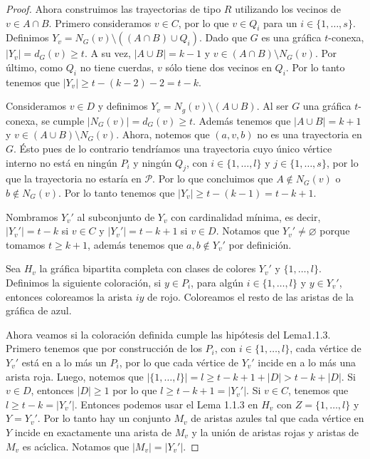 \begin{proof}
    Ahora construimos las trayectorias de tipo $R$ utilizando los vecinos de $v
    \in A \cap B$. Primero consideramos $v \in C$, por lo que $v \in Q_i$ para
    un  $i \in \{1, \dots, s\}$. Definimos $Y_v = N_G(v) \setminus ((A \cap B)
    \cup Q_i)$. Dado que $G$ es una gr\'afica $t$-conexa, $|Y_v| = d_G(v) \geq
    t$. A su vez, $|A \cup B| =k -1$ y $v \in (A \cap B) \setminus N_G(v)$. Por
    \'ultimo, como $Q_i$ no tiene cuerdas, $v$ s\'olo tiene dos vecinos en
    $Q_i$. Por lo tanto tenemos que $|Y_v| \geq t- (k-2)-2 = t-k$. 
    
    Consideramos $v \in D$ y definimos $Y_v = N_g(v) \setminus (A \cup
    B)$. Al ser $G$ una gr\'afica $t$-conexa, se cumple $|N_G(v)| = d_G(v) \geq
    t$. Adem\'as tenemos que $|A \cup B| = k + 1$ y $v \in (A \cup B) \setminus
    N_G(v)$. Ahora, notemos que $(a, v, b)$ no es una trayectoria en $G$. \'Esto
    pues de lo contrario tendr\'i{}amos una trayectoria cuyo \'unico v\'ertice
    interno no est\'a en ning\'un $P_i$ y ning\'un $Q_j$, con $i \in \{1, \dots,
    l\}$ y $j \in \{1, \dots, s\}$, por lo que la trayectoria no estar\'i{}a en
    $\mathcal{P}$. Por lo que concluimos que $A \notin N_G(v)$ o $b \notin
    N_G(v)$. Por lo tanto tenemos que $|Y_v| \geq t- (k-1) = t-k + 1$.

    Nombramos $Y_v '$ al subconjunto de $Y_v$ con cardinalidad m\'i{}nima, es
    decir, $|Y_v '| = t-k$ si $v \in C$ y $|Y_v '| = t- k+ 1$ si $v \in D$.
    Notamos que $Y_v ' \neq \varnothing$ porque tomamos $t \geq k + 1$, adem\'as
    tenemos que $a, b \notin Y_v '$ por definici\'on. 

    Sea $H_v$ la gr\'afica bipartita completa con clases de colores $Y_v '$ y
    $\{1,\dots, l\}$. Definimos la siguiente coloraci\'on, si $y \in P_i$, para
    alg\'un $i \in \{1, \dots, l\}$ y $y \in Y_v '$, entonces coloreamos la arista
    $iy$ de rojo. Coloreamos el resto de las aristas de la gr\'afica de azul.
    
    Ahora veamos si la coloraci\'on definida cumple las hip\'otesis del
    Lema1.1.3. Primero tenemos que por construcci\'on de los $P_i$, con $i \in
    \{1, \dots, l\}$, cada v\'ertice de $Y_v '$ est\'a en a lo m\'as un $P_i$,
    por lo que cada v\'ertice de $Y_v '$ incide en a lo m\'as una arista roja.
    Luego, notemos que $|\{1, \dots, l\}| = l  \geq t-k+ 1+ |D| > t-k + |D|$. Si
    $v \in D$, entonces $|D| \geq 1$ por lo que $l \geq t- k+1 = |Y_v '|$. Si $v
    \in C$, tenemos que $l \geq t-k = |Y_v '|$. Entonces podemos usar el Lema
    1.1.3 en $H_v$ con $Z= \{1, \dots, l\}$ y $Y = Y_v '$. Por lo tanto hay un
    conjunto $M_v$ de aristas azules tal que cada v\'ertice en $Y$ incide en
    exactamente una arista de $M_v$ y la uni\'on de aristas rojas y aristas de
    $M_v$ es ac\'\i{}clica. Notamos que $|M_v|=|Y_v '|$.


\end{proof}
